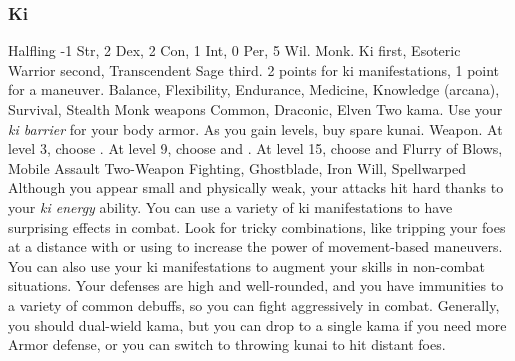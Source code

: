         \subsubsection{Ki}
             Halfling
             -1 Str, 2 Dex, 2 Con, 1 Int, 0 Per, 5 Wil.
             Monk.
             Ki first, Esoteric Warrior second, Transcendent Sage third.
             2 points for ki manifestations, 1 point for a maneuver.
             Balance, Flexibility, Endurance, Medicine, Knowledge (arcana), Survival, Stealth
             Monk weapons
             Common, Draconic, Elven
             Two kama. Use your \textit{ki barrier} for your body armor. As you gain levels, buy spare kunai.
             Weapon.
                At level 3, choose .
                At level 9, choose  and .
                At level 15, choose  and 
             Flurry of Blows, Mobile Assault
             Two-Weapon Fighting, Ghostblade, Iron Will, Spellwarped
             Although you appear small and physically weak, your attacks hit hard thanks to your \textit{ki energy} ability.
            You can use a variety of ki manifestations to have surprising effects in combat.
            Look for tricky combinations, like tripping your foes at a distance with  or using  to increase the power of movement-based maneuvers.
            You can also use your ki manifestations to augment your skills in non-combat situations.
            Your defenses are high and well-rounded, and you have immunities to a variety of common debuffs, so you can fight aggressively in combat.
            Generally, you should dual-wield kama, but you can drop to a single kama if you need more Armor defense, or you can switch to throwing kunai to hit distant foes.

